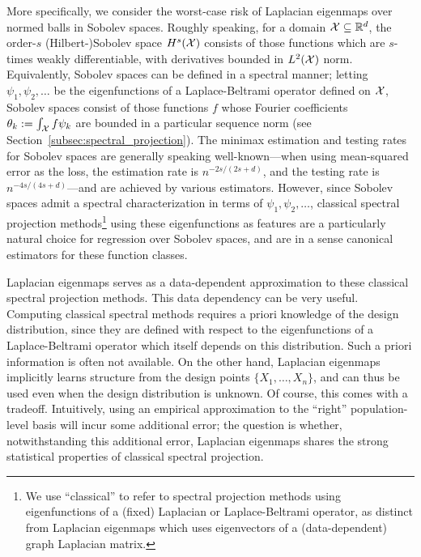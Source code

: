 More specifically, we consider the worst-case risk of Laplacian eigenmaps over normed balls in Sobolev spaces. Roughly speaking, for a domain $\mathcal{X} \subseteq \mathbb{R}^d$, the order-$s$ (Hilbert-)Sobolev space $H^s(\mathcal{X})$ consists of those functions which are $s$-times weakly differentiable, with derivatives bounded in $L^2(\mathcal{X})$ norm. Equivalently, Sobolev spaces can be defined in a spectral manner;  letting $\psi_1,\psi_2,\ldots$ be the eigenfunctions of a Laplace-Beltrami operator defined on $\mathcal{X}$, Sobolev spaces consist of those functions $f$ whose Fourier coefficients $\theta_k := \int_{\mathcal{X}} f \psi_k$ are bounded in a particular sequence norm (see Section~\ref{subsec:spectral_projection}). The minimax estimation and testing rates for Sobolev spaces are generally speaking well-known---when using mean-squared error as the loss, the estimation rate is $n^{-2s/(2s + d)}$, and the testing rate is $n^{-4s/(4s + d)}$---and are achieved by various estimators. However, since Sobolev spaces admit a spectral characterization in terms of $\psi_1,\psi_2,\ldots$, classical spectral projection methods\footnote{We use ``classical'' to refer to spectral projection methods using eigenfunctions of a (fixed) Laplacian or Laplace-Beltrami operator, as distinct from Laplacian eigenmaps which uses eigenvectors of a (data-dependent) graph Laplacian matrix.} using these eigenfunctions as features are a particularly natural choice for regression over Sobolev spaces, and are in a sense canonical estimators for these function classes. 

Laplacian eigenmaps serves as a data-dependent approximation to these classical spectral projection methods. This data dependency can be very useful. Computing classical spectral methods requires a priori knowledge of the design distribution, since they are defined with respect to the eigenfunctions of a Laplace-Beltrami operator which itself depends on this distribution. Such a priori information is often not available. On the other hand, Laplacian eigenmaps implicitly learns structure from the design points $\{X_1,\ldots,X_n\}$, and can thus be used even when the design distribution is unknown. Of course, this comes with a tradeoff. Intuitively, using an empirical approximation to the ``right'' population-level basis will incur some additional error; the question is whether, notwithstanding this additional error, Laplacian eigenmaps shares the strong statistical properties of classical spectral projection.

